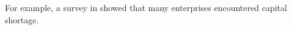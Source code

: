 \documentclass{article}
\begin{document}
For example, a survey in \citet{Survey2014} showed that many enterprises encountered capital shortage.
\printbibliography
\end{document}
